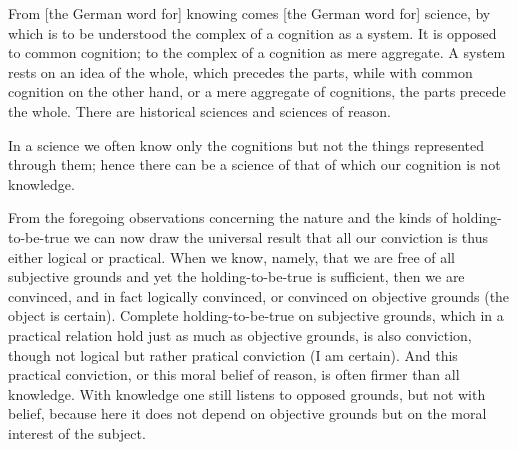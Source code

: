 From [the German word for] knowing comes [the German word for] science,
by which is to be understood the complex of a cognition as a system.
It is opposed to common cognition;
to the complex of a cognition as mere aggregate.
A system rests on an idea of the whole,
which precedes the parts,
while with common cognition on the other hand,
or a mere aggregate of cognitions,
the parts precede the whole.
There are historical sciences and sciences of reason.

In a science we often know only the cognitions
but not the things represented through them;
hence there can be a science of that
of which our cognition is not knowledge.

From the foregoing observations concerning
the nature and the kinds of holding-to-be-true
we can now draw the universal result that
all our conviction is thus either logical or practical.
When we know, namely, that we are free of all subjective grounds
and yet the holding-to-be-true is sufficient,
then we are convinced, and in fact logically convinced, or
convinced on objective grounds (the object is certain).
Complete holding-to-be-true on subjective grounds,
which in a practical relation hold just as much as objective grounds,
is also conviction, though not logical
but rather pratical conviction (I am certain).
And this practical conviction, or this moral belief of reason,
is often firmer than all knowledge.
With knowledge one still listens to opposed grounds,
but not with belief, because here it does not depend on
objective grounds but on the moral interest of the subject.
